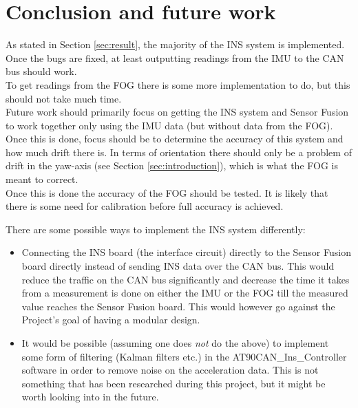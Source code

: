
\section{Conclusion and future work}\label{sec:conclusion}
As stated in Section \ref{sec:result}, the majority of the INS system is implemented. Once the bugs are fixed, at least outputting readings from the IMU to the CAN bus should work. \\
To get readings from the FOG there is some more implementation to do, but this should not take much time. \\ %
Future work should primarily focus on getting the INS system and Sensor Fusion to work together only using the IMU data (but without data from the FOG). Once this is done, focus should be to determine the accuracy of this system and how much drift there is. In terms of orientation there should only be a problem of drift in the yaw-axis (see Section \ref{sec:introduction}), which is what the FOG is meant to correct. \\
Once this is done the accuracy of the FOG should be tested. It is likely that there is some need for calibration before full accuracy is achieved.

There are some possible ways to implement the INS system differently:

\begin{itemize}
\item Connecting the INS board (the interface circuit) directly to the Sensor Fusion board directly instead of sending INS data over the CAN bus. This would reduce the traffic on the CAN bus significantly and decrease the time it takes from a measurement is done on either the IMU or the FOG till the measured value reaches the Sensor Fusion board. This would however go against the Project's goal of having a modular design.

\item It would be possible (assuming one does \emph{not} do the above) to implement some form of filtering (Kalman filters etc.) in the AT90CAN\_Ins\_Controller software in order to remove noise on the acceleration data. This is not something that has been researched during this project, but it might be worth looking into in the future.

\end{itemize}



